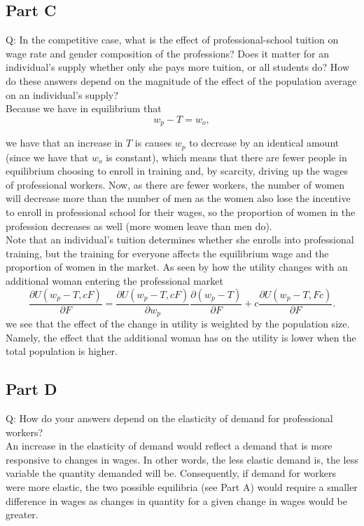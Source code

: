 \documentclass{article}
\begin{document}
\subsection*{Part C}
Q: In the competitive case, what is the effect of professional-school tuition on wage rate and gender composition of the professions? Does it matter for an individual’s supply whether only she pays more tuition, or all students do? How do these answers depend on the magnitude of the effect of the population average on an individual’s supply?
\\
Because we have in equilibrium that
$$ w_p- T=w_o,$$

we have that an increase in $T$ is causes $w_p$ to decrease by an identical amount (since we have that $w_o$ is constant), which means that there are fewer people in equilibrium choosing to enroll in training and, by scarcity, driving up the wages of professional workers. Now, as there are fewer workers, the number of women will decrease more than the number of men as the women also lose the incentive to enroll in professional school for their wages, so the proportion of women in the profession decreases as well (more women leave than men do). \\

Note that an individual's tuition determines whether she enrolls into professional training, but the training for everyone affects the equilibrium wage and the proportion of women in the market. As seen by how the utility changes with an additional woman entering the professional market 
$$\frac{\partial U(w_p - T, cF)}{\partial F} = \frac{\partial U(w_p - T, cF)}{\partial w_p}\frac{\partial (w_p-T)}{\partial F} + c\frac{\partial U(w_p - T, Fc)}{\partial F}. $$
we see that the effect of the change in utility is weighted by the population size. Namely, the effect that the additional woman has on the utility is lower when the total population is higher.  

\subsection*{Part D}
Q: How do your answers depend on the elasticity of demand for professional workers?
\\

An increase in the elasticity of demand would reflect a demand that is more responsive to changes in wages. In other words, the less elastic demand is, the less variable the quantity demanded will be. Consequently, if demand for workers were more elastic, the two possible equilibria (see Part A) would require a smaller difference in wages as changes in quantity for a given change in wages would be greater.
\\
\end{document}
